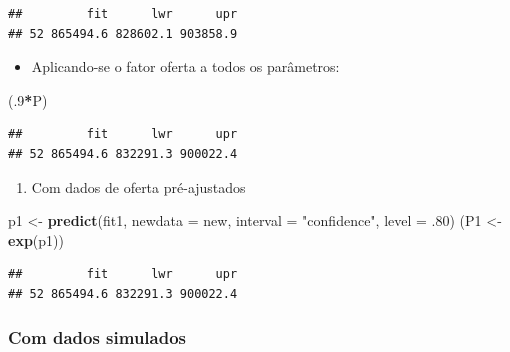 \documentclass{article}
\newenvironment{Shaded}{\begin{snugshade}}{\end{snugshade}}
\newcommand{\DataTypeTok}[1]{\textcolor[rgb]{0.13,0.29,0.53}{#1}}
\newcommand{\DecValTok}[1]{\textcolor[rgb]{0.00,0.00,0.81}{#1}}
\newcommand{\FloatTok}[1]{\textcolor[rgb]{0.00,0.00,0.81}{#1}}
\newcommand{\KeywordTok}[1]{\textcolor[rgb]{0.13,0.29,0.53}{\textbf{#1}}}
\newcommand{\NormalTok}[1]{#1}
\newcommand{\OperatorTok}[1]{\textcolor[rgb]{0.81,0.36,0.00}{\textbf{#1}}}
\newcommand{\StringTok}[1]{\textcolor[rgb]{0.31,0.60,0.02}{#1}}
\begin{document}
\begin{verbatim}
##         fit      lwr      upr
## 52 865494.6 828602.1 903858.9
\end{verbatim}

\begin{itemize}
\tightlist
\item
  Aplicando-se o fator oferta a todos os parâmetros:
\end{itemize}

\begin{Shaded}
\begin{Highlighting}[]
\NormalTok{(.}\DecValTok{9}\OperatorTok{*}\NormalTok{P)}
\end{Highlighting}
\end{Shaded}

\begin{verbatim}
##         fit      lwr      upr
## 52 865494.6 832291.3 900022.4
\end{verbatim}

\begin{enumerate}
\def\labelenumi{\alph{enumi}.}
\setcounter{enumi}{1}
\tightlist
\item
  Com dados de oferta pré-ajustados
\end{enumerate}

\begin{Shaded}
\begin{Highlighting}[]
\NormalTok{p1 <-}\StringTok{ }\KeywordTok{predict}\NormalTok{(fit1, }\DataTypeTok{newdata =}\NormalTok{ new, }\DataTypeTok{interval =} \StringTok{"confidence"}\NormalTok{, }\DataTypeTok{level =} \FloatTok{.80}\NormalTok{)}
\NormalTok{(P1 <-}\StringTok{ }\KeywordTok{exp}\NormalTok{(p1))}
\end{Highlighting}
\end{Shaded}

\begin{verbatim}
##         fit      lwr      upr
## 52 865494.6 832291.3 900022.4
\end{verbatim}

\hypertarget{com-dados-simulados}{%
\subsubsection{Com dados simulados}\label{com-dados-simulados}}
\end{document}
